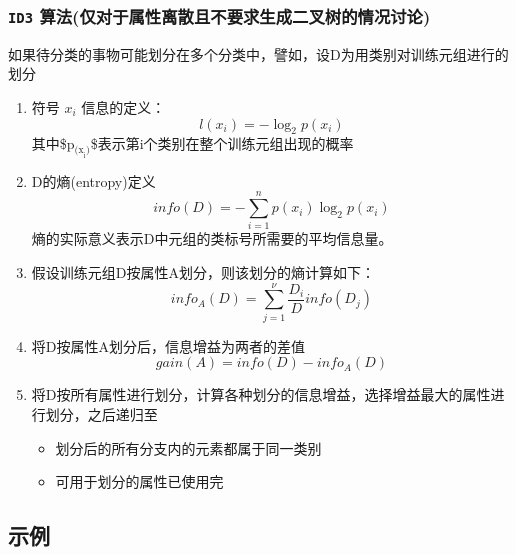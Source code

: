 \documentclass[11pt]{ctexart}
\begin{document}
\subsubsection{\texttt{ID3} 算法(仅对于属性离散且不要求生成二叉树的情况讨论)}
\label{sec:orgheadline14}
如果待分类的事物可能划分在多个分类中，譬如，设D为用类别对训练元组进行的划分
\begin{enumerate}
\item 符号 \(x_i\) 信息的定义：
\begin{equation}
  l(x_i) = -\log_{2}p(x_i)
\end{equation}
其中\$p\(_{\text{(x}_{\text{i}}\text{)}}\)\$表示第i个类别在整个训练元组出现的概率
\item D的熵(entropy)定义
\begin{equation}
  info(D) = -\sum^n_{i=1}p(x_i)\log_{2}p(x_i)
\end{equation}
熵的实际意义表示D中元组的类标号所需要的平均信息量。
\item 假设训练元组D按属性A划分，则该划分的熵计算如下：
\begin{equation}
  info_A(D)=\sum^{\nu}_{j=1}\frac{D_i}{D}info(D_j)
\end{equation}
\item 将D按属性A划分后，信息增益为两者的差值
\begin{equation}
  gain(A) = info(D) - info_A(D)
\end{equation}
\item 将D按所有属性进行划分，计算各种划分的信息增益，选择增益最大的属性进行划分，之后递归至
\begin{itemize}
\item 划分后的所有分支内的元素都属于同一类别
\item 可用于划分的属性已使用完
\end{itemize}
\end{enumerate}
\subsection{示例}
\label{sec:orgheadline19}
\end{document}
